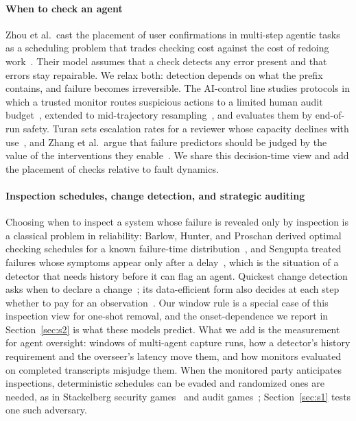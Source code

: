 \documentclass[pdflatex,sn-mathphys-num]{sn-jnl}
\theoremstyle{thmstyleone}%
\begin{document}
\paragraph{When to check an agent}
Zhou et al.\ cast the placement of user confirmations in multi-step agentic tasks as a scheduling problem that trades checking cost against the cost of redoing work~\cite{zhou2026whenshouldcheck}. Their model assumes that a check detects any error present and that errors stay repairable. We relax both: detection depends on what the prefix contains, and failure becomes irreversible. The AI-control line studies protocols in which a trusted monitor routes suspicious actions to a limited human audit budget~\cite{greenblatt2024aicontrol}, extended to mid-trajectory resampling~\cite{bhatt2025ctrlz}, and evaluates them by end-of-run safety. Turan sets escalation rates for a reviewer whose capacity declines with use~\cite{turan2026capacity}, and Zhang et al.\ argue that failure predictors should be judged by the value of the interventions they enable~\cite{zhang2026calibration}. We share this decision-time view and add the placement of checks relative to fault dynamics.

\paragraph{Inspection schedules, change detection, and strategic auditing}
Choosing when to inspect a system whose failure is revealed only by inspection is a classical problem in reliability: Barlow, Hunter, and Proschan derived optimal checking schedules for a known failure-time distribution~\cite{barlow1963checking}, and Sengupta treated failures whose symptoms appear only after a delay~\cite{sengupta1980delayed}, which is the situation of a detector that needs history before it can flag an agent. Quickest change detection asks when to declare a change~\cite{page1954,wald1945,shiryaev1963,veeravalli2014qcd}; its data-efficient form also decides at each step whether to pay for an observation~\cite{banerjee2012dequickest}. Our window rule is a special case of this inspection view for one-shot removal, and the onset-dependence we report in Section~\ref{sec:s2} is what these models predict. What we add is the measurement for agent oversight: windows of multi-agent capture runs, how a detector's history requirement and the overseer's latency move them, and how monitors evaluated on completed transcripts misjudge them. When the monitored party anticipates inspections, deterministic schedules can be evaded and randomized ones are needed, as in Stackelberg security games~\cite{paruchuri2008playing} and audit games~\cite{blocki2015auditgames}; Section~\ref{sec:s1} tests one such adversary.
\end{document}
